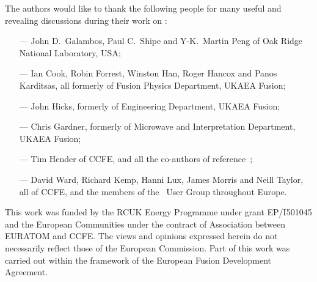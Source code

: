 \label{chap:acks}

The authors would like to thank the following people for many useful
and revealing discussions during their work on \process:

\begin{itemize}
\item[---]
John D.\ Galambos, Paul C.\ Shipe and Y-K.\ Martin Peng of Oak Ridge
National Laboratory, USA;
\item[---]
Ian Cook, Robin Forrest, Winston Han, Roger Hancox and Panos Karditsas, all formerly of
Fusion Physics Department, UKAEA Fusion;
\item[---]
John Hicks, formerly of Engineering Department, UKAEA Fusion;
\item[---]
Chris Gardner, formerly of Microwave and Interpretation Department, UKAEA
Fusion;
\item[---]
Tim Hender of CCFE, and all the co-authors of reference~\cite{172};
\item[---]
David Ward, Richard Kemp, Hanni Lux, James Morris and Neill Taylor, all of
CCFE, and the members of the \process\ User Group throughout Europe.
\end{itemize}

This work was funded by the RCUK Energy Programme under grant EP/I501045 and
the European Communities under the contract of Association between EURATOM and
CCFE\@. The views and opinions expressed herein do not necessarily reflect those
of the European Commission. Part of this work was carried out within the
framework of the European Fusion Development Agreement.

